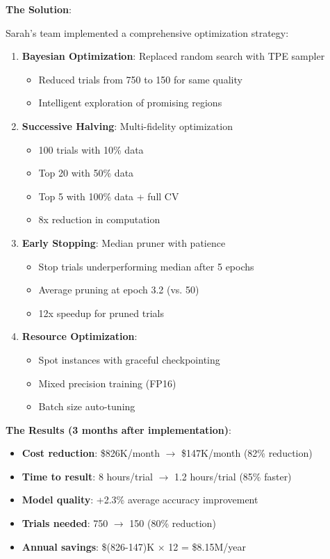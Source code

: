\textbf{The Solution}:

Sarah's team implemented a comprehensive optimization strategy:

\begin{enumerate}
    \item \textbf{Bayesian Optimization}: Replaced random search with TPE sampler
    \begin{itemize}
        \item Reduced trials from 750 to 150 for same quality
        \item Intelligent exploration of promising regions
    \end{itemize}

    \item \textbf{Successive Halving}: Multi-fidelity optimization
    \begin{itemize}
        \item 100 trials with 10\% data
        \item Top 20 with 50\% data
        \item Top 5 with 100\% data + full CV
        \item 8x reduction in computation
    \end{itemize}

    \item \textbf{Early Stopping}: Median pruner with patience
    \begin{itemize}
        \item Stop trials underperforming median after 5 epochs
        \item Average pruning at epoch 3.2 (vs. 50)
        \item 12x speedup for pruned trials
    \end{itemize}

    \item \textbf{Resource Optimization}:
    \begin{itemize}
        \item Spot instances with graceful checkpointing
        \item Mixed precision training (FP16)
        \item Batch size auto-tuning
    \end{itemize}
\end{enumerate}

\textbf{The Results (3 months after implementation)}:

\begin{itemize}
    \item \textbf{Cost reduction}: \$826K/month $\rightarrow$ \$147K/month (82\% reduction)
    \item \textbf{Time to result}: 8 hours/trial $\rightarrow$ 1.2 hours/trial (85\% faster)
    \item \textbf{Model quality}: +2.3\% average accuracy improvement
    \item \textbf{Trials needed}: 750 $\rightarrow$ 150 (80\% reduction)
    \item \textbf{Annual savings}: \$(826-147)K $\times$ 12 = \$8.15M/year
\end{itemize}

